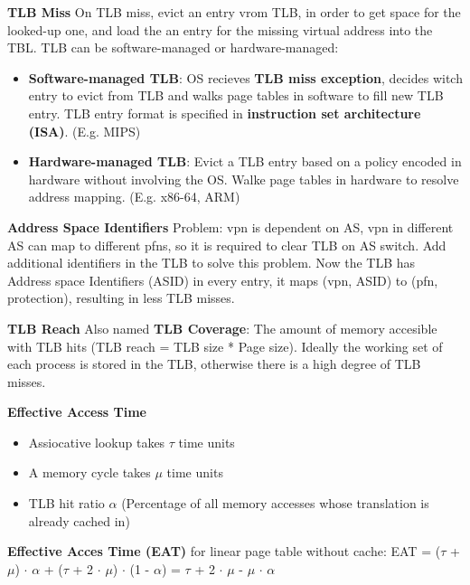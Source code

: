 \documentclass[11pt,a4paper]{article}
\begin{document}
	\textbf{TLB Miss} \newline
	On TLB miss, evict an entry vrom TLB, in order to get space for the looked-up one, and load the an entry for the missing virtual address into the TBL. \newline
	TLB can be software-managed or hardware-managed:
	\begin{itemize}
		\item \textbf{Software-managed TLB}: OS recieves \textbf{TLB miss exception}, decides witch entry to evict from TLB and walks page tables in software to fill new TLB entry. TLB entry format is specified in \textbf{instruction set architecture (ISA)}. (E.g. MIPS)
		\item \textbf{Hardware-managed TLB}:  Evict a TLB entry based on a policy encoded in hardware without involving the OS. Walke page tables in hardware to resolve address mapping. (E.g. x86-64, ARM)
	\end{itemize}

	\textbf{Address Space Identifiers} \newline
	Problem: vpn is dependent on AS, vpn in different AS can map to different pfns, so it is required to clear TLB on AS switch. \newline
	Add additional identifiers in the TLB to solve this problem. Now the TLB has Address space Identifiers (ASID) in every entry, it maps (vpn, ASID) to (pfn, protection), resulting in less TLB misses. \newline
	
	\textbf{TLB Reach} \newline
	Also named \textbf{TLB Coverage}: The amount of memory accesible with TLB hits (TLB reach = TLB size * Page size). Ideally the working set of each process is stored in the TLB, otherwise there is a high degree of TLB misses. \newline
	
	\textbf{Effective Access Time}
	\begin{itemize}
		\item Assiocative lookup takes $\tau$ time units
		\item A memory cycle takes $\mu$ time units
		\item TLB hit ratio $\alpha$ (Percentage of all memory accesses whose translation is already cached in)
	\end{itemize}
	\textbf{Effective Acces Time (EAT)} for linear page table without cache: \newline
	EAT = ($\tau$ + $\mu$) $\cdot$ $\alpha$ + ($\tau$ + 2 $\cdot$ $\mu$) $\cdot$ (1 - $\alpha$) = $\tau$ + 2 $\cdot$ $\mu$ - $\mu$ $\cdot$ $\alpha$
	
	
	
	
	\newpage
	
	\printglossaries
	
	
	
\end{document}

